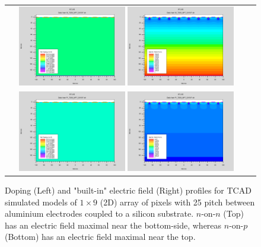 \begin{figure}[!htb]
  \begin{center}
    \begin{tabular}{cc}
      \includegraphics[width=0.45\textwidth]{fig_FastTiming/Net_Doping_nonn.png}
      \includegraphics[width=0.45\textwidth]{fig_FastTiming/ElectricField_nonn.png} \\
      \includegraphics[width=0.45\textwidth]{fig_FastTiming/Net_Doping_nonp.png}
      \includegraphics[width=0.45\textwidth]{fig_FastTiming/ElectricField_nonp.png} \\
    \end{tabular}
    \caption{Doping (Left) and "built-in" electric field (Right) profiles for TCAD simulated models of $1 \times 9$ (2D) array of pixels with 25 \si{\micron} pitch between aluminium electrodes coupled to a silicon substrate.
            $n$-on-$n$ (Top) has an electric field maximal near the bottom-side, whereas $n$-on-$p$ (Bottom) has an electric field maximal near the top.
            }
    \label{Doping_ElectricField}
  \end{center}
\end{figure}

